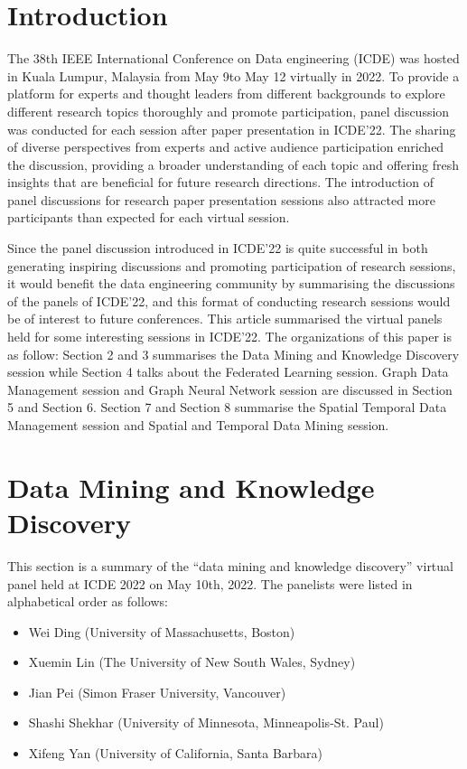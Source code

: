 \documentclass[11pt,dvipdfm]{article}
\begin{document}
\section{Introduction}
The 38th IEEE International Conference on Data engineering (ICDE) was hosted in Kuala Lumpur, Malaysia from May 9to May 12 virtually in 2022. To provide a platform for experts and thought leaders from different backgrounds to explore different research topics thoroughly and promote participation, panel discussion was conducted for each session after paper presentation in ICDE'22. The sharing of diverse perspectives from experts and active audience participation enriched the discussion, providing a broader understanding of each topic and offering fresh insights that are beneficial for future research directions. The introduction of panel discussions for research paper presentation sessions also attracted more participants than expected for each virtual session. 

Since the panel discussion introduced in ICDE'22 is quite successful in both generating inspiring discussions and  promoting participation of research sessions, it would benefit the data engineering community by summarising the discussions of the  panels of ICDE'22, and this format of conducting research sessions would be of interest to future conferences. This article summarised the virtual panels held for some interesting sessions in ICDE'22. The organizations of this paper is as follow: Section 2 and 3 summarises the Data Mining and Knowledge Discovery session while Section 4 talks about the Federated Learning session. Graph Data Management session and Graph Neural Network session are discussed in Section 5 and Section 6. Section 7 and Section 8 summarise the Spatial Temporal Data Management session and Spatial and Temporal Data Mining session.



\section{Data Mining and Knowledge Discovery}

This section is a summary of the “data mining and knowledge discovery” virtual panel held at ICDE 2022 on May 10th, 2022. The panelists were listed in alphabetical order as follows:

\begin{itemize}
    \item Wei Ding (University of Massachusetts, Boston)
    \item Xuemin Lin (The University of New South Wales, Sydney)
    \item Jian Pei (Simon Fraser University, Vancouver)
    \item Shashi Shekhar (University of Minnesota, Minneapolis-St. Paul)
    \item Xifeng Yan (University of California, Santa Barbara)
\end{itemize}
\end{document}
